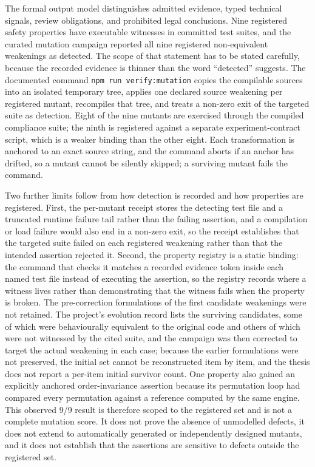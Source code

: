 The formal output model distinguishes admitted evidence, typed technical signals, review obligations, and prohibited legal conclusions. Nine registered safety properties have executable witnesses in committed test suites, and the curated mutation campaign reported all nine registered non-equivalent weakenings as detected. The scope of that statement has to be stated carefully, because the recorded evidence is thinner than the word ``detected'' suggests. The documented command \texttt{npm run verify:mutation} copies the compilable sources into an isolated temporary tree, applies one declared source weakening per registered mutant, recompiles that tree, and treats a non-zero exit of the targeted suite as detection. Eight of the nine mutants are exercised through the compiled compliance suite; the ninth is registered against a separate experiment-contract script, which is a weaker binding than the other eight. Each transformation is anchored to an exact source string, and the command aborts if an anchor has drifted, so a mutant cannot be silently skipped; a surviving mutant fails the command.

Two further limits follow from how detection is recorded and how properties are registered. First, the per-mutant receipt stores the detecting test file and a truncated runtime failure tail rather than the failing assertion, and a compilation or load failure would also end in a non-zero exit, so the receipt establishes that the targeted suite failed on each registered weakening rather than that the intended assertion rejected it. Second, the property registry is a static binding: the command that checks it matches a recorded evidence token inside each named test file instead of executing the assertion, so the registry records where a witness lives rather than demonstrating that the witness fails when the property is broken. The pre-correction formulations of the first candidate weakenings were not retained. The project's evolution record lists the surviving candidates, some of which were behaviourally equivalent to the original code and others of which were not witnessed by the cited suite, and the campaign was then corrected to target the actual weakening in each case; because the earlier formulations were not preserved, the initial set cannot be reconstructed item by item, and the thesis does not report a per-item initial survivor count. One property also gained an explicitly anchored order-invariance assertion because its permutation loop had compared every permutation against a reference computed by the same engine. This observed 9/9 result is therefore scoped to the registered set and is not a complete mutation score. It does not prove the absence of unmodelled defects, it does not extend to automatically generated or independently designed mutants, and it does not establish that the assertions are sensitive to defects outside the registered set.

